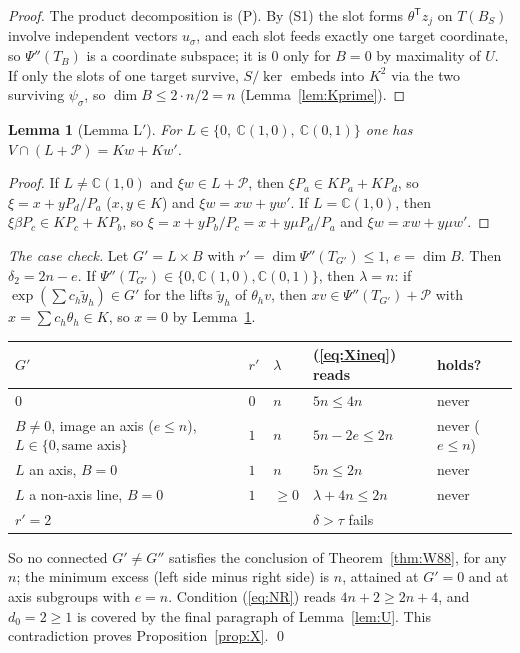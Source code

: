 \documentclass[11pt]{amsart}
\newtheorem{lemma}[theorem]{Lemma}
\theoremstyle{definition}
\newcommand{\C}{\mathbb{C}}
\begin{document}
\begin{proof}
The product decomposition is (P). By (S1) the slot forms $\theta^{\mathsf T}z_j$ on $T(B_S)$ involve independent vectors
$u_\sigma$, and each slot feeds exactly one target coordinate, so $\Psi''(T_B)$ is a coordinate subspace; it is $0$ only for
$B=0$ by maximality of $U$. If only the slots of one target survive, $S/\ker$ embeds into $K^{2}$ via the two surviving
$\psi_\sigma$, so $\dim B\le2\cdot n/2=n$ (Lemma~\ref{lem:Kprime}).
\end{proof}

\begin{lemma}[Lemma L$'$]\label{lem:Lprime}
For $L\in\{0,\ \C(1,0),\ \C(0,1)\}$ one has $V\cap(L+\mathcal P)=Kw+Kw'$.
\end{lemma}

\begin{proof}
If $L\ne\C(1,0)$ and $\xi w\in L+\mathcal P$, then $\xi P_a\in KP_a+KP_d$, so $\xi=x+yP_d/P_a$ ($x,y\in K$) and
$\xi w=xw+yw'$. If $L=\C(1,0)$, then $\xi\beta P_c\in KP_c+KP_b$, so $\xi=x+yP_b/P_c=x+y\mu P_d/P_a$ and $\xi w=xw+y\mu w'$.
\end{proof}

\emph{The case check.} Let $G'=L\times B$ with $r'=\dim\Psi''(T_{G'})\le1$, $e=\dim B$. Then $\delta_2=2n-e$. If
$\Psi''(T_{G'})\in\{0,\C(1,0),\C(0,1)\}$, then $\lambda=n$: if $\exp(\sum c_h\tilde y_h)\in G'$ for the lifts $\tilde y_h$
of $\theta_hv$, then $xv\in\Psi''(T_{G'})+\mathcal P$ with $x=\sum c_h\theta_h\in K$, so $x=0$ by Lemma~\ref{lem:Lprime}.
\begin{center}
\begin{tabular}{lllll}
$G'$ & $r'$ & $\lambda$ & (\ref{eq:Xineq}) reads & holds?\\\hline
$0$ & $0$ & $n$ & $5n\le4n$ & never\\
$B\ne0$, image an axis ($e\le n$), $L\in\{0,\text{same axis}\}$ & $1$ & $n$ & $5n-2e\le2n$ & never ($e\le n$)\\
$L$ an axis, $B=0$ & $1$ & $n$ & $5n\le2n$ & never\\
$L$ a non-axis line, $B=0$ & $1$ & $\ge0$ & $\lambda+4n\le2n$ & never\\
$r'=2$ & & & $\delta>\tau$ fails &
\end{tabular}
\end{center}
So no connected $G'\ne G''$ satisfies the conclusion of Theorem~\ref{thm:W88}, for any $n$; the minimum excess
(left side minus right side) is $n$, attained at $G'=0$ and at axis subgroups with $e=n$. Condition (\ref{eq:NR}) reads
$4n+2\ge2n+4$, and $d_0=2\ge1$ is covered by the final paragraph of Lemma~\ref{lem:U}. This contradiction proves
Proposition~\ref{prop:X}. \qed
\end{document}
